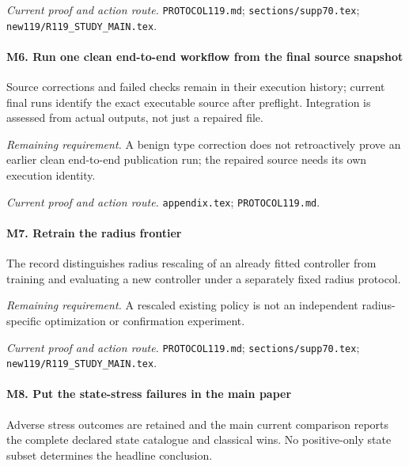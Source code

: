 \par\emph{Current proof and action route.} \nolinkurl{PROTOCOL119.md}; \nolinkurl{sections/supp70.tex}; \nolinkurl{new119/R119_STUDY_MAIN.tex}.

\paragraph{M6. Run one clean end-to-end workflow from the final source snapshot}

Source corrections and failed checks remain in their execution history; current final runs identify the exact executable source after preflight. Integration is assessed from actual outputs, not just a repaired file.

\par\emph{Remaining requirement.} A benign type correction does not retroactively prove an earlier clean end-to-end publication run; the repaired source needs its own execution identity.

\par\emph{Current proof and action route.} \nolinkurl{appendix.tex}; \nolinkurl{PROTOCOL119.md}.

\paragraph{M7. Retrain the radius frontier}

The record distinguishes radius rescaling of an already fitted controller from training and evaluating a new controller under a separately fixed radius protocol.

\par\emph{Remaining requirement.} A rescaled existing policy is not an independent radius-specific optimization or confirmation experiment.

\par\emph{Current proof and action route.} \nolinkurl{PROTOCOL119.md}; \nolinkurl{sections/supp70.tex}; \nolinkurl{new119/R119_STUDY_MAIN.tex}.

\paragraph{M8. Put the state-stress failures in the main paper}

Adverse stress outcomes are retained and the main current comparison reports the complete declared state catalogue and classical wins. No positive-only state subset determines the headline conclusion.

